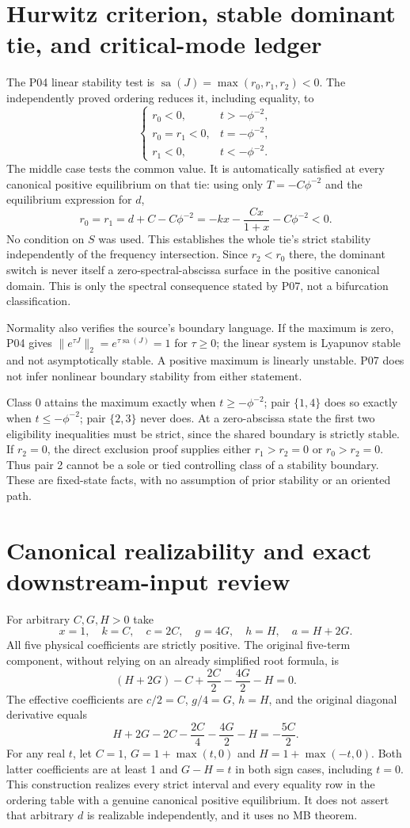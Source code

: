 \documentclass[11pt]{article}
\DeclareMathOperator{\sa}{sa}
\begin{document}
\section{Hurwitz criterion, stable dominant tie, and critical-mode ledger}
\label{sec:stability}
The P04 linear stability test is $\sa(J)=\max(r_0,r_1,r_2)<0$.
The independently proved ordering reduces it, including equality, to
\[
 \begin{cases}
 r_0<0,&t>-\phi^{-2},\\
 r_0=r_1<0,&t=-\phi^{-2},\\
 r_1<0,&t<-\phi^{-2}.
 \end{cases}
\]
The middle case tests the common value. It is automatically satisfied
at every canonical positive equilibrium on that tie: using only
$T=-C\phi^{-2}$ and the equilibrium expression for $d$,
\[
 \boxed{r_0=r_1=d+C-C\phi^{-2}
 =-kx-\frac{Cx}{1+x}-C\phi^{-2}<0.}
\]
No condition on $S$ was used. This establishes the whole tie's strict
stability independently of the frequency intersection. Since $r_2<r_0$
there, the dominant switch is never itself a zero-spectral-abscissa
surface in the positive canonical domain. This is only the spectral
consequence stated by P07, not a bifurcation classification.

Normality also verifies the source's boundary language. If the maximum
is zero, P04 gives $\|e^{\tau J}\|_2=e^{\tau\sa(J)}=1$ for
$\tau\ge0$; the linear system is Lyapunov stable and not asymptotically
stable. A positive maximum is linearly unstable. P07 does not infer
nonlinear boundary stability from either statement.

Class 0 attains the maximum exactly when $t\ge-\phi^{-2}$; pair
$\{1,4\}$ does so exactly when $t\le-\phi^{-2}$; pair $\{2,3\}$
never does. At a zero-abscissa state the first two eligibility
inequalities must be strict, since the shared boundary is strictly
stable. If $r_2=0$, the direct exclusion proof supplies either
$r_1>r_2=0$ or $r_0>r_2=0$. Thus pair 2 cannot be a sole or tied
controlling class of a stability boundary. These are fixed-state
facts, with no assumption of prior stability or an oriented path.

\section{Canonical realizability and exact downstream-input review}
\label{sec:realization}
For arbitrary $C,G,H>0$ take
\[
 x=1,\quad k=C,\quad c=2C,\quad g=4G,\quad h=H,
 \quad a=H+2G.
\]
All five physical coefficients are strictly positive. The original
five-term component, without relying on an already simplified root
formula, is
\[
 (H+2G)-C+\frac{2C}{2}-\frac{4G}{2}-H=0.
\]
The effective coefficients are $c/2=C$, $g/4=G$, $h=H$, and
the original diagonal derivative equals
\[
 H+2G-2C-\frac{2C}{4}-\frac{4G}{2}-H=-\frac{5C}{2}.
\]
For any real $t$, let $C=1$, $G=1+\max(t,0)$ and
$H=1+\max(-t,0)$. Both latter coefficients are at least 1 and
$G-H=t$ in both sign cases, including $t=0$. This construction
realizes every strict interval and every equality row in the ordering
table with a genuine canonical positive equilibrium. It does not
assert that arbitrary $d$ is realizable independently, and it uses
no MB theorem.
\end{document}
